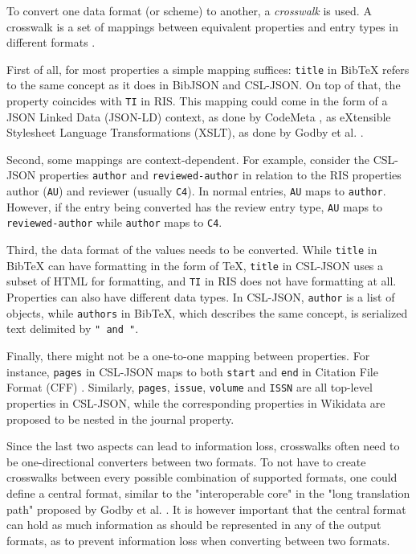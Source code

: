 \documentclass[fleqn,10pt,lineno]{wlpeerj} %
\begin{document}
To convert one data format (or scheme) to another, a \emph{crosswalk} is used. A crosswalk is a set of mappings between equivalent properties and entry types in different formats \cite{pierre_issues_1998}.

First of all, for most properties a simple mapping suffices: \texttt{title} in BibTeX refers to the same concept as it does in BibJSON and CSL-JSON. On top of that, the property coincides with \texttt{TI} in RIS. This mapping could come in the form of a JSON Linked Data (JSON-LD) context, as done by CodeMeta \citep{jones_codemeta:_2017}, as eXtensible Stylesheet Language Transformations (XSLT), as done by Godby et al. \cite{godby_two_2003}.

Second, some mappings are context-dependent. For example, consider the CSL-JSON properties \texttt{author} and \texttt{reviewed-author} in relation to the RIS properties author (\texttt{AU}) and reviewer (usually \texttt{C4}). In normal entries, \texttt{AU} maps to \texttt{author}. However, if the entry being converted has the review entry type, \texttt{AU} maps to \texttt{reviewed-author} while \texttt{author} maps to \texttt{C4}.

Third, the data format of the values needs to be converted. While \texttt{title} in BibTeX can have formatting in the form of \TeX, \texttt{title} in CSL-JSON uses a subset of HTML for formatting, and \texttt{TI} in RIS does not have formatting at all. Properties can also have different data types. In CSL-JSON, \texttt{author} is a list of objects, while \texttt{authors} in BibTeX, which describes the same concept, is serialized text delimited by \texttt{" and "}.

Finally, there might not be a one-to-one mapping between properties. For instance, \texttt{pages} in CSL-JSON maps to both \texttt{start} and \texttt{end} in Citation File Format (CFF) \citep{druskat_citation_2018}. Similarly, \texttt{pages}, \texttt{issue}, \texttt{volume} and \texttt{ISSN} are all top-level properties in CSL-JSON, while the corresponding properties in Wikidata are proposed to be nested in the journal property.

Since the last two aspects can lead to information loss, crosswalks often need to be one-directional converters between two formats. To not have to create crosswalks between every possible combination of supported formats, one could define a central format, similar to the "interoperable core" in the "long translation path" proposed by Godby et al. \cite{godby_two_2003}. It is however important that the central format can hold as much information as should be represented in any of the output formats, as to prevent information loss when converting between two formats.
\end{document}
